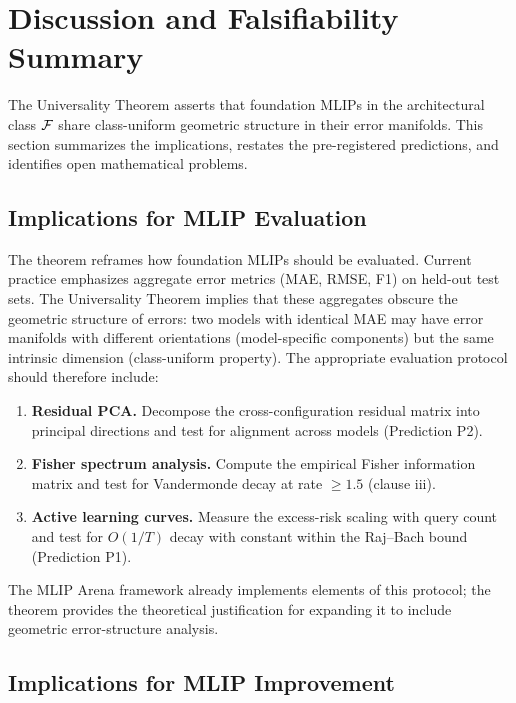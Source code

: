 \section{Discussion and Falsifiability Summary}\label{sec:discussion}

The Universality Theorem asserts that foundation MLIPs in the architectural class $\mathcal{F}$ share class-uniform geometric structure in their error manifolds. This section summarizes the implications, restates the pre-registered predictions, and identifies open mathematical problems.

\subsection{Implications for MLIP Evaluation}

The theorem reframes how foundation MLIPs should be evaluated. Current practice emphasizes aggregate error metrics (MAE, RMSE, F1) on held-out test sets. The Universality Theorem implies that these aggregates obscure the geometric structure of errors: two models with identical MAE may have error manifolds with different orientations (model-specific components) but the same intrinsic dimension (class-uniform property). The appropriate evaluation protocol should therefore include:
\begin{enumerate}
    \item \textbf{Residual PCA.} Decompose the cross-configuration residual matrix into principal directions and test for alignment across models (Prediction P2).
    \item \textbf{Fisher spectrum analysis.} Compute the empirical Fisher information matrix and test for Vandermonde decay at rate $\geq 1.5$ (clause iii).
    \item \textbf{Active learning curves.} Measure the excess-risk scaling with query count and test for $O(1/T)$ decay with constant within the Raj--Bach bound (Prediction P1).
\end{enumerate}

The MLIP Arena\cite{chiang2025mliparena} framework already implements elements of this protocol; the theorem provides the theoretical justification for expanding it to include geometric error-structure analysis.

\subsection{Implications for MLIP Improvement}

